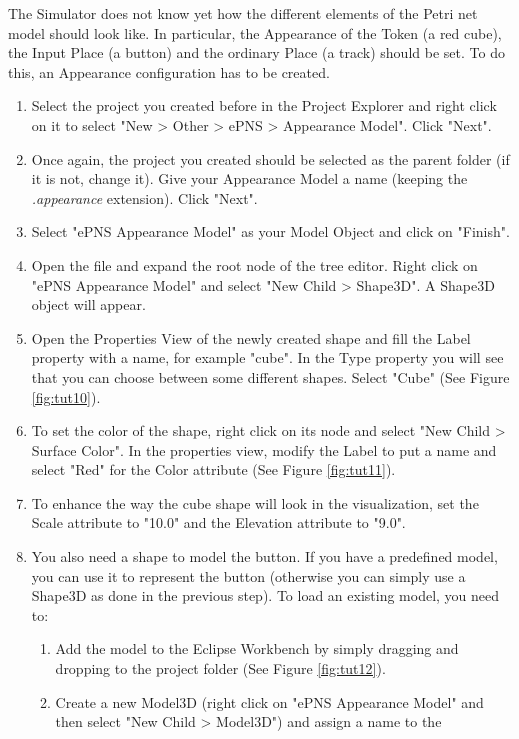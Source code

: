 The Simulator does not know yet how the different elements of the Petri net model should look like. In particular, the Appearance of the
Token (a red cube), the Input Place (a button) and the ordinary Place (a track) should be set. To do this, an Appearance configuration 
has to be created.  
\begin{enumerate}
  \item Select the project you created before in the Project Explorer and right click on it to select "New > Other > ePNS > 
  Appearance Model". Click "Next".
  \item Once again, the project you created should be selected as the parent folder (if it is not, change it). Give your 
  Appearance Model a name (keeping the \textit{.appearance} extension). Click "Next".
  \item Select "ePNS Appearance Model" as your Model Object and click on "Finish".
  \item Open the file and expand the root node of the tree editor. Right click on "ePNS Appearance Model" and select "New Child > Shape3D". 
  A Shape3D object will appear. 
  \item Open the Properties View of the newly created shape and fill the Label property with a name, for example "cube". In the 
  Type property you will see that you can choose between some different shapes. Select "Cube" (See Figure \ref{fig:tut10}).
  \item To set the color of the shape, right click on its node and select "New Child > Surface Color". In the properties view, modify the Label
  to put a name and select "Red" for the Color attribute (See Figure \ref{fig:tut11}). 
  \item To enhance the way the cube shape will look in the visualization, set the Scale attribute to "10.0" and the Elevation attribute to "9.0".
  \item You also need a shape to model the button. If you have a predefined model, you can use it to represent the button (otherwise you can simply use a Shape3D as done in the previous step). To load an existing model, you need to: 
  \begin{enumerate}
    \item Add the model to the Eclipse Workbench by simply dragging and dropping to the project folder (See Figure \ref{fig:tut12}).
    \item Create a new Model3D (right click on "ePNS Appearance Model" and then select "New Child > Model3D") and assign a name to the 

\end{enumerate}
\end{enumerate}
